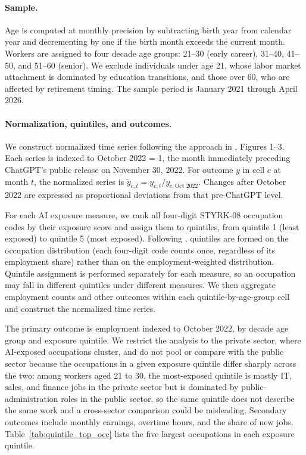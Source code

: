 \documentclass[12pt]{article}
\begin{document}
\paragraph{Sample.}
Age is computed at monthly precision by subtracting birth year from calendar year and decrementing by one if the birth month exceeds the current month. Workers are assigned to four decade age groups: 21--30 (early career), 31--40, 41--50, and 51--60 (senior). We exclude individuals under age 21, whose labor market attachment is dominated by education transitions, and those over 60, who are affected by retirement timing. The sample period is January 2021 through April 2026.

\paragraph{Normalization, quintiles, and outcomes.}\label{sec:data:approach}

We construct normalized time series following the approach in \citet{brynjolfsson2025}, Figures 1--3. Each series is indexed to October 2022 = 1, the month immediately preceding ChatGPT's public release on November 30, 2022. For outcome $y$ in cell $c$ at month $t$, the normalized series is $\tilde{y}_{c,t} = y_{c,t} / y_{c,\text{Oct } 2022}$. Changes after October 2022 are expressed as proportional deviations from that pre-ChatGPT level.

For each AI exposure measure, we rank all four-digit STYRK-08 occupation codes by their exposure score and assign them to quintiles, from quintile 1 (least exposed) to quintile 5 (most exposed). Following \citet{brynjolfsson2025}, quintiles are formed on the occupation distribution (each four-digit code counts once, regardless of its employment share) rather than on the employment-weighted distribution. Quintile assignment is performed separately for each measure, so an occupation may fall in different quintiles under different measures. We then aggregate employment counts and other outcomes within each quintile-by-age-group cell and construct the normalized time series.

The primary outcome is employment indexed to October 2022, by decade age group and exposure quintile. We restrict the analysis to the private sector, where AI-exposed occupations cluster, and do not pool or compare with the public sector because the occupations in a given exposure quintile differ sharply across the two: among workers aged 21 to 30, the most-exposed quintile is mostly IT, sales, and finance jobs in the private sector but is dominated by public-administration roles in the public sector, so the same quintile does not describe the same work and a cross-sector comparison could be misleading. Secondary outcomes include monthly earnings, overtime hours, and the share of new jobs. Table~\ref{tab:quintile_top_occ} lists the five largest occupations in each exposure quintile.
\end{document}

